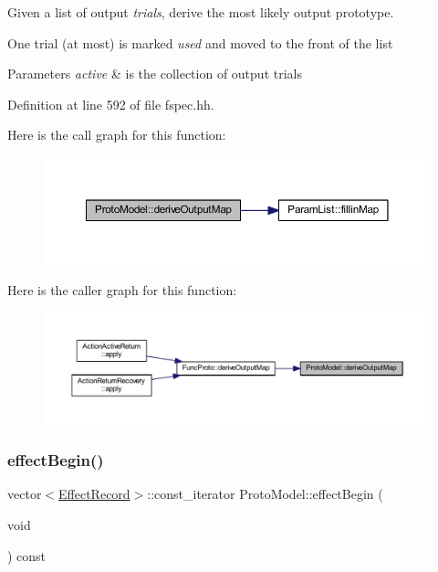 Given a list of output {\itshape trials}, derive the most likely output prototype. 

One trial (at most) is marked {\itshape used} and moved to the front of the list 
\begin{DoxyParams}{Parameters}
{\em active} & is the collection of output trials \\
\hline
\end{DoxyParams}


Definition at line 592 of file fspec.\+hh.

Here is the call graph for this function\+:
\nopagebreak
\begin{figure}[H]
\begin{center}
\leavevmode
\includegraphics[width=350pt]{class_proto_model_a463595607985ec774f3df35dfbd7ca94_cgraph}
\end{center}
\end{figure}
Here is the caller graph for this function\+:
\nopagebreak
\begin{figure}[H]
\begin{center}
\leavevmode
\includegraphics[width=350pt]{class_proto_model_a463595607985ec774f3df35dfbd7ca94_icgraph}
\end{center}
\end{figure}
\mbox{\label{class_proto_model_a5c9fa95940e32b03d475257ca177cfaa}} 
\subsubsection{\texorpdfstring{effectBegin()}{effectBegin()}}
{\footnotesize\ttfamily vector$<$\mbox{\hyperlink{class_effect_record}{Effect\+Record}}$>$\+::const\+\_\+iterator Proto\+Model\+::effect\+Begin (\begin{DoxyParamCaption}\item[{void}]{ }\end{DoxyParamCaption}) const\hspace{0.3cm}{\ttfamily [inline]}}



